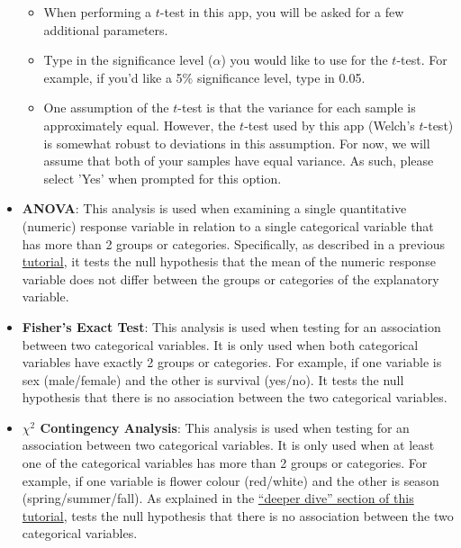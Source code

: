\documentclass[
]{book}
\providecommand{\tightlist}{%
  \setlength{\itemsep}{0pt}\setlength{\parskip}{0pt}}
\begin{document}
\begin{itemize}
  \begin{itemize}
  \tightlist
  \item
    When performing a \(t\)-test in this app, you will be asked for a few additional parameters.
  \item
    Type in the significance level (\(\alpha\)) you would like to use for the \(t\)-test. For example, if you'd like a 5\% significance level, type in 0.05.
  \item
    One assumption of the \(t\)-test is that the variance for each sample is approximately equal. However, the \(t\)-test used by this app (Welch's \(t\)-test) is somewhat robust to deviations in this assumption. For now, we will assume that both of your samples have equal variance. As such, please select 'Yes' when prompted for this option.
  \end{itemize}
\item
  \textbf{ANOVA}: This analysis is used when examining a single quantitative (numeric) response variable in relation to a single categorical variable that has more than 2 groups or categories. Specifically, as described in a previous \href{https://ubco-biology.github.io/BIOL-116-Lab-Manual/which-statistical-test-to-use.html\#scenario-1-continuous-numeric-dependent-variable-and-categorical-independent-variable}{tutorial}, it tests the null hypothesis that the mean of the numeric response variable does not differ between the groups or categories of the explanatory variable.
\item
  \textbf{Fisher's Exact Test}: This analysis is used when testing for an association between two categorical variables. It is only used when both categorical variables have exactly 2 groups or categories. For example, if one variable is sex (male/female) and the other is survival (yes/no). It tests the null hypothesis that there is no association between the two categorical variables.
\item
  \textbf{\(\chi^2\) Contingency Analysis}: This analysis is used when testing for an association between two categorical variables. It is only used when at least one of the categorical variables has more than 2 groups or categories. For example, if one variable is flower colour (red/white) and the other is season (spring/summer/fall). As explained in the \href{https://ubco-biology.github.io/BIOL-116-Lab-Manual/which-statistical-test-to-use.html\#comparing-frequencies-to-a-baseline-expectation}{``deeper dive'' section of this tutorial}, tests the null hypothesis that there is no association between the two categorical variables.
\end{itemize}
\end{document}
